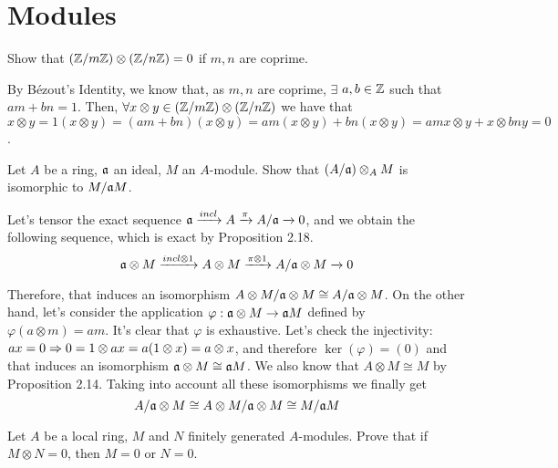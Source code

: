 \section{Modules}

\begin{ex}
	Show that $(\mathbb{Z}/m\mathbb{Z}) \otimes (\mathbb{Z}/n\mathbb{Z}) = 0$ if $m, n$ are coprime.
\end{ex}

\begin{sol}
	By Bézout's Identity, we know that, as $m,n$ are coprime, $\exists$ $a,b \in \mathbb{Z}$ such that $am+bn = 1$. Then, $\forall x \otimes y \in (\mathbb{Z}/m\mathbb{Z}) \otimes (\mathbb{Z}/n\mathbb{Z})$ we have that 
	$
	x \otimes y = 1(x \otimes y) = (am+bn)(x \otimes y) = am(x \otimes y) + bn(x \otimes y) = amx \otimes y + x \otimes bny = 0
	$.
\end{sol}

\begin{ex}
	Let $A$ be a ring, $\mathfrak{a}$ an ideal, $M$ an $A$-module. Show that $(A/\mathfrak{a}) \otimes_A M$ is isomorphic to $M/\mathfrak{a} M$.
\end{ex}

\begin{sol}
	Let's tensor the exact sequence $\mathfrak{a} \xrightarrow[]{incl} A \xrightarrow[]{\pi}  A/\mathfrak{a} \xrightarrow[]{}  0$, and we obtain the following sequence, which is exact by Proposition 2.18.
	\[
		\mathfrak{a} \otimes M \xrightarrow[]{incl \otimes 1} A \otimes M \xrightarrow[]{\pi \otimes 1}  A/\mathfrak{a}  \otimes M \xrightarrow[]{} 0
	\]

	Therefore, that induces an isomorphism $A \otimes M / \mathfrak{a} \otimes M \cong A/\mathfrak{a} \otimes M$. On the other hand, let's consider the application $\varphi: \mathfrak{a} \otimes M \to \mathfrak{a} M$ defined by $\varphi(a \otimes m) = am$. It's clear that $\varphi$ is exhaustive. Let's check the injectivity: $ax = 0 \Rightarrow 0 = 1 \otimes ax = a(1 \otimes x) = a \otimes x$, and therefore $\ker(\varphi) = (0)$ and that induces an isomorphism $\mathfrak{a} \otimes M \cong \mathfrak{a} M$. We also know that $A \otimes M \cong M$ by Proposition 2.14. Taking into account all these isomorphisms we finally get
	\[
		A/\mathfrak{a} \otimes M \cong A \otimes M / \mathfrak{a} \otimes M \cong M/\mathfrak{a} M
	\]
\end{sol}

\begin{ex}
 Let $A$ be a local ring, $M$ and $N$ finitely generated $A$-modules. Prove that if $M \otimes N = 0$, then $M = 0$ or $N = 0$.
\end{ex}

